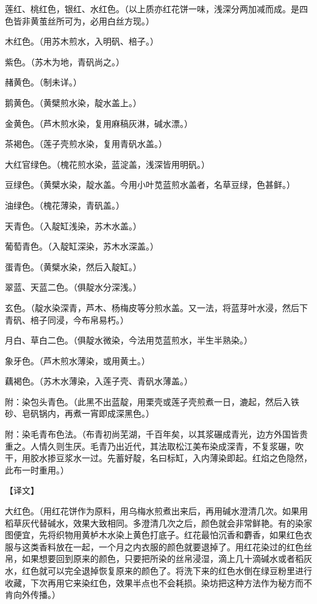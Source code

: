 \documentclass[12pt,UTF8]{ctexbook}
\begin{document}
莲红、桃红色，银红、水红色。（以上质亦红花饼一味，浅深分两加减而成。是四色皆非黄茧丝所可为，必用白丝方现。）

木红色。（用苏木煎水，入明矾、棓子。）

紫色。（苏木为地，青矾尚之。）

赭黄色。（制未详。）

鹅黄色。（黄檗煎水染，靛水盖上。）

金黄色。（芦木煎水染，复用麻稿灰淋，碱水漂。）

茶褐色。（莲子壳煎水染，复用青矾水盖。）

大红官绿色。（槐花煎水染，蓝淀盖，浅深皆用明矾。）

豆绿色。（黄檗水染，靛水盖。今用小叶苋蓝煎水盖者，名草豆绿，色甚鲜。）

油绿色。（槐花薄染，青矾盖。）

天青色。（入靛缸浅染，苏木水盖。）

葡萄青色。（入靛缸深染，苏木水深盖。）

蛋青色。（黄檗水染，然后入靛缸。）

翠蓝、天蓝二色。（俱靛水分深浅。）

玄色。（靛水染深青，芦木、杨梅皮等分煎水盖。又一法，将蓝芽叶水浸，然后下青矾、棓子同浸，今布帛易朽。）

月白、草白二色。（俱靛水微染，今法用苋蓝煎水，半生半熟染。）

象牙色。（芦木煎水薄染，或用黄土。）

藕褐色。（苏木水薄染，入莲子壳、青矾水薄盖。）

附：染包头青色。（此黑不出蓝靛，用栗壳或莲子壳煎煮一日，漉起，然后入铁砂、皂矾锅内，再煮一宵即成深黑色。）

附：染毛青布色法。（布青初尚芜湖，千百年矣，以其浆碾成青光，边方外国皆贵重之。人情久则生厌。毛青乃出近代，其法取松江美布染成深青，不复浆碾，吹干，用胶水掺豆浆水一过。先蓄好靛，名曰标缸，入内薄染即起。红焰之色隐然，此布一时重用。）

【译文】

大红色。（用红花饼作为原料，用乌梅水煎煮出来后，再用碱水澄清几次。如果用稻草灰代替碱水，效果大致相同。多澄清几次之后，颜色就会非常鲜艳。有的染家图便宜，先将织物用黄栌木水染上黄色打底子。红花最怕沉香和麝香，如果红色衣服与这类香料放在一起，一个月之内衣服的颜色就要退掉了。用红花染过的红色丝帛，如果想要回到原来的颜色，只要把所染的丝帛浸湿，滴上几十滴碱水或者稻灰水，红色就可以完全退掉恢复原来的颜色了。将洗下来的红色水倒在绿豆粉里进行收藏，下次再用它来染红色，效果半点也不会耗损。染坊把这种方法作为秘方而不肯向外传播。）
\end{document}
